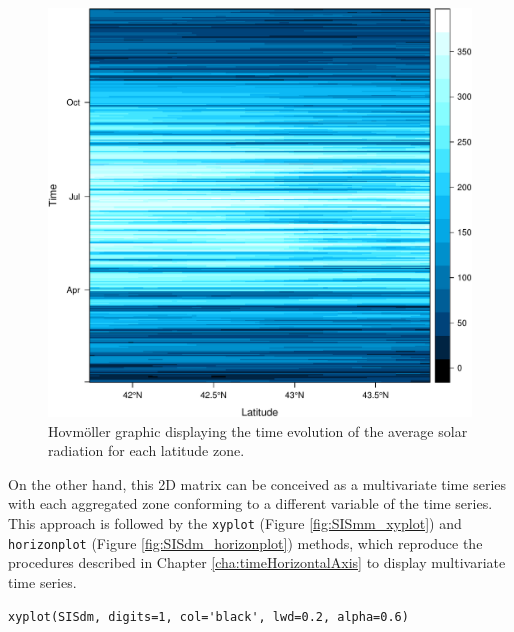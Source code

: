 \documentclass[smallroyalvopaper]{memoir}
\begin{document}
\begin{figure}[htb]
\centering
\includegraphics[width=.9\linewidth]{figs/SISdm_hovmoller_lat.pdf}
\caption{\label{fig:SISdm_hovmoller_lat}Hovmöller graphic displaying the time evolution of the average solar radiation for each latitude zone.}
\end{figure}

On the other hand, this 2D matrix can be conceived as a multivariate
time series with each aggregated zone conforming to a different variable of
the time series. This approach is followed by the \texttt{xyplot} (Figure
\ref{fig:SISmm_xyplot}) and \texttt{horizonplot} (Figure \ref{fig:SISdm_horizonplot})
methods, which reproduce the procedures described in Chapter
\ref{cha:timeHorizontalAxis} to display multivariate time series.


\lstset{language=R,numbers=none}
\begin{lstlisting}
xyplot(SISdm, digits=1, col='black', lwd=0.2, alpha=0.6)
\end{lstlisting}
\end{document}
